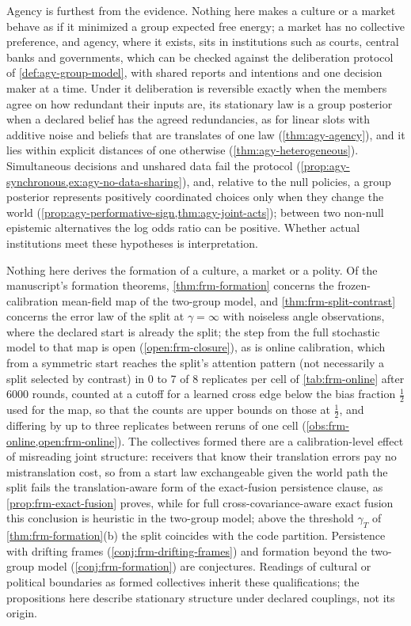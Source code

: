 Agency is furthest from the evidence. Nothing here makes a culture or a market behave as if it minimized a group expected free energy; a market has no collective preference, and agency, where it exists, sits in institutions such as courts, central banks and governments, which can be checked against the deliberation protocol of \cref{def:agy-group-model}, with shared reports and intentions and one decision maker at a time. Under it deliberation is reversible exactly when the members agree on how redundant their inputs are, its stationary law is a group posterior when a declared belief has the agreed redundancies, as for linear slots with additive noise and beliefs that are translates of one law (\cref{thm:agy-agency}), and it lies within explicit distances of one otherwise (\cref{thm:agy-heterogeneous}). Simultaneous decisions and unshared data fail the protocol (\cref{prop:agy-synchronous,ex:agy-no-data-sharing}), and, relative to the null policies, a group posterior represents positively coordinated choices only when they change the world (\cref{prop:agy-performative-sign,thm:agy-joint-acts}); between two non-null epistemic alternatives the log odds ratio can be positive. Whether actual institutions meet these hypotheses is interpretation.

Nothing here derives the formation of a culture, a market or a polity. Of the manuscript's formation theorems, \cref{thm:frm-formation} concerns the frozen-calibration mean-field map of the two-group model, and \cref{thm:frm-split-contrast} concerns the error law of the split at $\gamma=\infty$ with noiseless angle observations, where the declared start is already the split; the step from the full stochastic model to that map is open (\cref{open:frm-closure}), as is online calibration, which from a symmetric start reaches the split's attention pattern (not necessarily a split selected by contrast) in 0 to 7 of 8 replicates per cell of \cref{tab:frm-online} after 6000 rounds, counted at a cutoff for a learned cross edge below the bias fraction $\frac12$ used for the map, so that the counts are upper bounds on those at $\frac12$, and differing by up to three replicates between reruns of one cell (\cref{obs:frm-online,open:frm-online}). The collectives formed there are a calibration-level effect of misreading joint structure: receivers that know their translation errors pay no mistranslation cost, so from a start law exchangeable given the world path the split fails the translation-aware form of the exact-fusion persistence clause, as \cref{prop:frm-exact-fusion} proves, while for full cross-covariance-aware exact fusion this conclusion is heuristic in the two-group model; above the threshold $\gamma_T$ of \cref{thm:frm-formation}(b) the split coincides with the code partition. Persistence with drifting frames (\cref{conj:frm-drifting-frames}) and formation beyond the two-group model (\cref{conj:frm-formation}) are conjectures. Readings of cultural or political boundaries as formed collectives inherit these qualifications; the propositions here describe stationary structure under declared couplings, not its origin.

